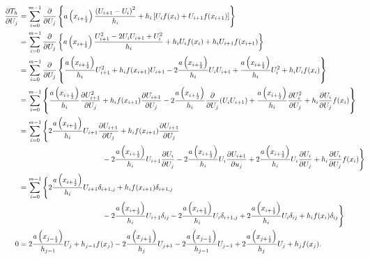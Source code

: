 \documentclass[12pt]{article}
\begin{document}
\begin{subequations}
    \begin{align}
        \hspace{-2.2cm}\pdv{T_{h}}{U_{j}} &= \sum\limits_{i=0}^{m-1}\pdv{U_{j}}\left\{
        a\left(x_{i+\frac{1}{2}}\right)\dfrac{\left(U_{i+1}-U_{i}\right)^{2}}{h_{i}}
        +  h_{i}\left[U_{i}f(x_{i})+U_{i+1}f(x_{i+1})\right]\right \}\\
        &= \sum\limits_{i=0}^{m-1}\pdv{U_{j}}
        \left\{a\left(x_{i+\frac{1}{2}}\right)\dfrac{U_{i+1}^{2}-2U_{i}U_{i+1}+U_{i}^{2}}{h_{i}}
        +  h_{i}U_{i}f(x_{i})+h_{i}U_{i+1}f(x_{i+1})\right\}\\
        &= \sum\limits_{i=0}^{m-1}\pdv{U_{j}}
        \left\{
        \dfrac{a\left(x_{i+\frac{1}{2}}\right)}{h_{i}}U_{i+1}^{2}
        + h_{i}f(x_{i+1})U_{i+1} - 2\dfrac{a\left(x_{i+\frac{1}{2}}\right)}{h_{i}}U_{i}U_{i+1} + \dfrac{a\left(x_{i+\frac{1}{2}}\right)}{h_{i}}U_{i}^{2}
        + h_{i}U_{i}f(x_{i})
        \right\}\\
        &= \sum\limits_{i=0}^{m-1}
        \left\{
        \dfrac{a\left(x_{i+\frac{1}{2}}\right)}{h_{i}}\pdv{U_{i+1}^{2}}{U_{j}}
        + h_{i}f(x_{i+1})\pdv{U_{i+1}}{U_{j}} - 2\dfrac{a\left(x_{i+\frac{1}{2}}\right)}{h_{i}}\pdv{U_{j}}(U_{i}U_{i+1}) + \dfrac{a\left(x_{i+\frac{1}{2}}\right)}{h_{i}}\pdv{U_{i}^{2}}{U_{j}}
        + h_{i}\pdv{U_{i}}{U_{j}}f(x_{i})
        \right\}\\
        &= \sum\limits_{i=0}^{m-1}
        \Bigg\{
        2\dfrac{a\left(x_{i+\frac{1}{2}}\right)}{h_{i}}U_{i+1}\pdv{U_{i+1}}{U_{j}}
        + h_{i}f(x_{i+1})\pdv{U_{i+1}}{U_{j}} \nonumber\\
        &\hspace{4cm}- 2\dfrac{a\left(x_{i+\frac{1}{2}}\right)}{h_{i}}U_{i+1}\pdv{U_{i}}{U_{j}}
        - 2\dfrac{a\left(x_{i+\frac{1}{2}}\right)}{h_{i}}U_{i}\pdv{U_{i+1}}{u_{j}}
        + 2\dfrac{a\left(x_{i+\frac{1}{2}}\right)}{h_{i}}U_{i}\pdv{U_{i}}{U_{j}}
        + h_{i}\pdv{U_{i}}{U_{j}}f(x_{i})
        \Bigg\}\\
        &= \sum\limits_{i=0}^{m-1}
        \Bigg\{
        2\dfrac{a\left(x_{i+\frac{1}{2}}\right)}{h_{i}}U_{i+1}\delta_{i+1,j}
        + h_{i}f(x_{i+1})\delta_{i+1,j} \nonumber\\
        &\hspace{4cm}- 2\dfrac{a\left(x_{i+\frac{1}{2}}\right)}{h_{i}}U_{i+1}\delta_{ij}
        - 2\dfrac{a\left(x_{i+\frac{1}{2}}\right)}{h_{i}}U_{i}\delta_{i+1,j}
        + 2\dfrac{a\left(x_{i+\frac{1}{2}}\right)}{h_{i}}U_{i}\delta_{ij}
        + h_{i}f(x_{i})\delta_{ij}
        \Bigg\}\\
        0&=
        2\dfrac{a\left(x_{j-\frac{1}{2}}\right)}{h_{j-1}}U_{j}
        + h_{j-1}f(x_{j}) -2\dfrac{a\left(x_{j+\frac{1}{2}}\right)}{h_{j}}U_{j+1}
        - 2\dfrac{a\left(x_{j-\frac{1}{2}}\right)}{h_{j-1}}U_{j-1}
        + 2\dfrac{a\left(x_{j+\frac{1}{2}}\right)}{h_{j}}U_{j}
        + h_{j}f(x_{j}).
    \end{align}
\end{subequations}
\end{document}

